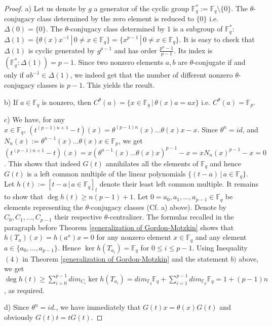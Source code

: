 \documentclass{amsproc}
\numberwithin{equation}{section}
\begin{document}
\begin{proof}
	a)   Let us denote by $g$ a generator of the cyclic group $\mathbb
	F_q^{*}:=\mathbb F_q \setminus\{0\}$. The $\theta$-conjugacy class
	determined by the zero element is reduced to $\{0\}$ i.e. $\Delta (0)=\{0\}$.
	The $\theta$-conjugacy class determined by $1$ is a subgroup of $\mathbb
	F_q^*$: $\Delta (1)=\{\theta (x)x^{-1}\,|\, 0\ne x\in \mathbb F_q
	\}=\{x^{p-1}\,|\, 0\ne x\in \mathbb F_q\}$.  It is easy to check
	that $\Delta (1)$ is cyclic generated by $g^{p-1}$ and has order
	$\frac{p^n-1}{p-1}$.  Its index is $(\mathbb F_q^* : \Delta
	(1))=p-1$.   Since two nonzero elements $a,b$ are
	$\theta$-conjugate if and only if $ab^{-1}\in \Delta (1)$,  we
	indeed get that the number of different nonzero $\theta$-conjugacy classes
	is $p-1$.   This yields the result.
	
	\noindent b) If $a\in \mathbb F_q$ is nonzero, then
	$C^{\theta}(a)=\{x\in \mathbb F_q\,|\, \theta(x)a=ax\}$ i.e.
	$C^{\theta}(a)=\mathbb F_p$.
	
	\noindent c)  We have, for any $x\in \mathbb F_q,\,
	(t^{(p-1)n+1}-t)(x)=\theta^{(p-1)n}(x)\dots \theta(x)x - x$. Since
	$\theta^n=id$, and $N_n(x):=\theta^{n-1}(x)\dots
	\theta(x)x \in \mathbb
	F_p$, we get $(t^{(p-1)n+1}-t)(x)=
	x(\theta^{n-1}(x)\dots\theta(x)x )^{p-1}-x=
	xN_n(x)^{p-1}-x=0$.  This shows that indeed $G(t)$ 
	annihilates all the elements
	of $\mathbb F_q$ and hence $G(t)$ is a  left common multiple of
	the linear polynomials $\{(t-a)\,|\,a\in \mathbb F_q\}$.  Let $h(t):=[t-a\,|\,a\in \mathbb F_q]_l$ denote their least left common multiple. It remains to show that
	$\deg h(t)\ge n(p-1)+1$.  Let $0=a_0,a_1,\dots,a_{p-1}\in \mathbb{F}_q$ be
	elements  representing the $\theta$-conjugacy classes (Cf. a) above).  Denote by $C_0,C_1,\dots,C_{p-1}$ their respective
	$\theta$-centralizer.  The formulas recalled in the paragraph before  Theorem \ref{generalization of Gordon-Motzkin} shows that 
	$h(T_a)(x)=h(a^x)x=0$ for any nonzero element $x\in \mathbb F_q$ and any element 
	$a\in\{a_0,\dots,a_{p-1}\}$.   
	Hence $\ker h(T_{a_i})=\mathbb F_q$ for $0\le i \le p-1$. Using
	Inequality $(4)$ in Theorem \ref{generalization of
		Gordon-Motzkin} and the statement $b)$ above, we get $\deg h(t)\ge
	\sum_{i=0}^{p-1} dim _{C_i}\ker h(T_{a_i})=dim_{\mathbb F_q}\mathbb
	F_q + \sum_{i=1}^{p-1}dim_{\mathbb F_p}\mathbb F_q =1+(p-1)n$, as
	required.
	
	\noindent d)  Since $\theta^n=id.$, we have immediately that
	$G(t)x=\theta(x)G(t)$ and obviously $G(t)t=tG(t)$.
\end{proof}
\end{document}
